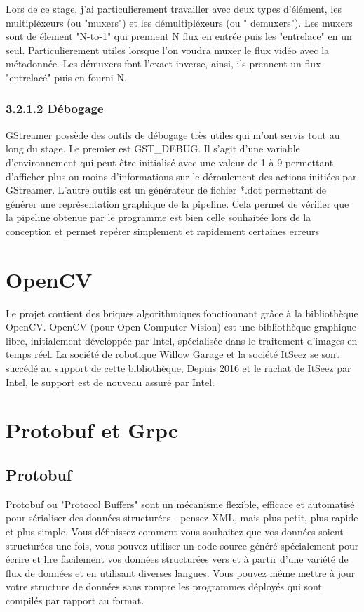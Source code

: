 Lors de ce stage, j'ai particulierement travailler avec deux types d'élément, les multipléxeurs (ou "muxers") et les démultipléxeurs (ou " demuxers"). Les muxers sont de élement "N-to-1" qui prennent N flux en entrée puis les "entrelace" en un seul. Particulierement utiles lorsque l'on voudra muxer le flux vidéo avec la métadonnée.
Les démuxers font l'exact inverse, ainsi, ils prennent un flux "entrelacé" puis en fourni N.



\subsubsection{3.2.1.2 Débogage}
GStreamer possède des outils de débogage très utiles qui m'ont servis tout au long du stage. Le premier est GST\_DEBUG. Il s'agit d'une variable d’environnement qui peut être initialisé avec une valeur de 1 à 9 permettant d'afficher plus ou moins d'informations sur le déroulement des actions initiées par GStreamer.
L'autre outils est un générateur de fichier *.dot permettant de générer une représentation graphique de la pipeline. Cela permet de vérifier que la pipeline obtenue par le programme est bien celle souhaitée lors de la conception et permet repérer simplement et rapidement certaines erreurs


\section{OpenCV}
Le projet contient des briques algorithmiques fonctionnant grâce à la bibliothèque OpenCV. OpenCV (pour Open Computer Vision) est une bibliothèque graphique libre, initialement développée par Intel, spécialisée dans le traitement d'images en temps réel. La société de robotique Willow Garage et la société ItSeez se sont succédé au support de cette bibliothèque, Depuis 2016 et le rachat de ItSeez par Intel, le support est de nouveau assuré par Intel.


\section{Protobuf et Grpc}

\subsection{Protobuf}
Protobuf ou "Protocol Buffers" sont un mécanisme flexible, efficace et automatisé pour sérialiser des données structurées - pensez XML, mais plus petit, plus rapide et plus simple. Vous définissez comment vous souhaitez que vos données soient structurées une fois, vous pouvez utiliser un code source généré spécialement pour écrire et lire facilement vos données structurées vers et à partir d'une variété de flux de données et en utilisant diverses langues. Vous pouvez même mettre à jour votre structure de données sans rompre les programmes déployés qui sont compilés par rapport au format.

